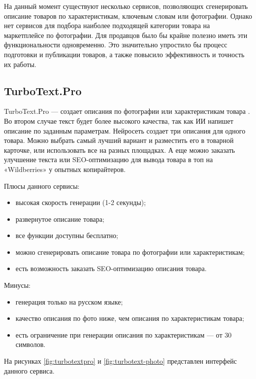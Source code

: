\documentclass[a4paper,12pt]{extarticle}
\begin{document}
На данный момент существуют несколько сервисов, позволяющих сгенерировать описание товаров по характеристикам, ключевым словам или фотографии. Однако нет сервисов для подбора наиболее подходящей категории товара на маркетплейсе по фотографии. Для продавцов было бы крайне полезно иметь эти функциональности одновременно. Это значительно упростило бы процесс подготовки и публикации товаров, а также повысило эффективность и точность их работы.

\subsection{TurboText.Pro}

TurboText.Pro — создает описания по фотографии или характеристикам товара \cite{turbotextpro}. Во втором случае текст будет более высокого качества, так как ИИ напишет описание по заданным параметрам. Нейросеть создает три описания для одного товара. Можно выбрать самый лучший вариант и разместить его в товарной карточке, или использовать все на разных площадках. А еще можно заказать улучшение текста или SEO-оптимизацию для вывода товара в топ на «Wildberries» у опытных копирайтеров.

Плюсы данного сервисы:
\begin{itemize}
	\item высокая скорость генерации (1-2 секунды);
	\item развернутое описание товара;
	\item все функции доступны бесплатно;
	\item можно сгенерировать описание товара по фотографии или характеристикам;
	\item есть возможность заказать SEO-оптимизацию описания товара.
\end{itemize}

Минусы:
\begin{itemize}
	\item генерация только на русском языке;
	\item качество описания по фото ниже, чем описания по характеристикам товара;
	\item есть ограничение при генерации описания по характеристикам — от 30 символов.
\end{itemize}

На рисунках \ref{fig:turbotextpro} и \ref{fig:turbotext-photo} представлен интерфейс данного сервиса.
\end{document}
